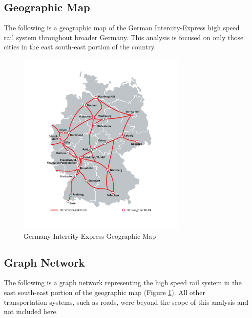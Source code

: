 \documentclass{article}
\begin{document}
\subsection*{Geographic Map}
The following is a geographic map of the German Intercity-Express high speed rail system throughout broader Germany. This analysis is focused on only those cities in the east south-east portion of the country.

    \begin{figure}[h]
        \centering
        \includegraphics[width=0.75\textwidth]{ger_map.png}
        \caption{Germany Intercity-Express Geographic Map \cite{bahn}}
        \label{fig:geomapger}
    \end{figure}

\newpage
\subsection*{Graph Network}
The following is a graph network representing the high speed rail system in the east south-east portion of the geographic map (Figure \ref{fig:geomapger}). All other transportation systems, such as roads, were beyond the scope of this analysis and not included here.
\end{document}

